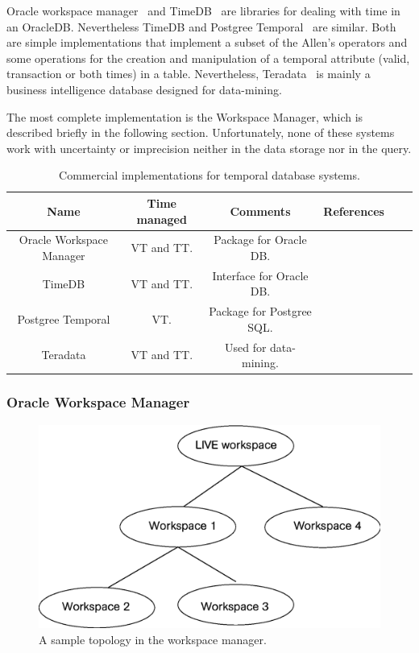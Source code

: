 Oracle workspace manager~\cite{oracle2009} and TimeDB~\cite{timedb2005} are libraries for dealing with time in an OracleDB. Nevertheless TimeDB and Postgree Temporal~\cite{posgree2009} are similar. Both are simple implementations that implement a subset of the Allen's operators and some operations for the creation and manipulation of a temporal attribute (valid, transaction or both times) in a table. Nevertheless, Teradata~\cite{teradata2011} is mainly a business intelligence database designed for data-mining. 

The most complete implementation is the Workspace Manager, which is described briefly in the following section. Unfortunately, none of these systems work with uncertainty or imprecision neither in the data storage nor in the query.

\begin{table}
\centering
\caption{Commercial implementations for temporal database systems. }
\begin{tabular}{c c c c c c }
\hline
\textbf{Name} & \textbf{Time managed} & \textbf{Comments} & \textbf{References}  \\ \hline
Oracle Workspace Manager & VT and TT. & Package for Oracle DB. & \cite{oracle2009}\\
TimeDB & VT and TT. & Interface for Oracle DB. & \cite{timedb2005}\\
Postgree Temporal & VT. & Package for Postgree SQL. & \cite{posgree2009}\\
Teradata & VT and TT. & Used for data-mining. & \cite{teradata2011}\\
\hline 
\end{tabular}
\label{table:commercial-temporal-db}



\end{table}

\subsubsection{Oracle Workspace Manager}

\begin{figure}
\centering
\includegraphics[scale=0.5]{graphs/workspaceTopology.eps}
\caption{A sample topology in the workspace manager.}
\label{fig:workspace-topology}
\end{figure}

